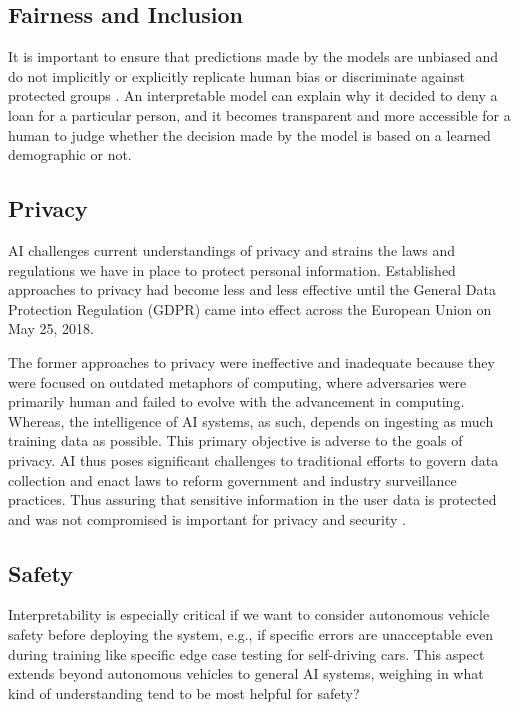 \subsection{Fairness and Inclusion}

It is important to ensure that predictions made by the models are unbiased and do not implicitly or explicitly replicate human bias or discriminate against protected groups \cite{ainow2016report}. An interpretable model can explain why it decided to deny a loan for a particular person, and it becomes transparent and more accessible for a human to judge whether the decision made by the model is based on a learned demographic or not.

\subsection{Privacy}

AI challenges current understandings of privacy and strains the laws and regulations we have in place to protect personal information. Established approaches to privacy had become less and less effective until the General Data Protection Regulation (GDPR) came into effect across the European Union on May 25, 2018.

The former approaches to privacy were ineffective and inadequate because they were focused on outdated metaphors of computing, where adversaries were primarily human and failed to evolve with the advancement in computing. Whereas, the intelligence of AI systems, as such, depends on ingesting as much training data as possible. This primary objective is adverse to the goals of privacy. AI thus poses significant challenges to traditional efforts to govern data collection and enact laws to reform government and industry surveillance practices. Thus assuring that sensitive information in the user data is protected and was not compromised is important for privacy and security \cite{molnar}. 

\subsection{Safety}

Interpretability is especially critical if we want to consider autonomous vehicle \cite{shannon_mattern} safety before deploying the system, e.g., if specific errors are unacceptable even during training like specific edge case testing for self-driving cars. This aspect extends beyond autonomous vehicles to general AI systems, weighing in what kind of understanding tend to be most helpful for safety?


